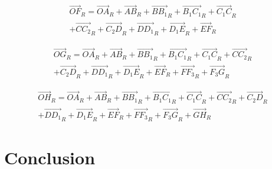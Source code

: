 \documentclass[12pt,a4paper]{article}
\begin{document}
\begin{equation}
    \begin{split}
        \vec{OF}_R=\vec{OA}_R+\vec{AB}_R+\vec{B B_1}_R+\vec{B_1 C_1}_R+\vec{C_1 C}_R\\+\vec{C C_2}_R+\vec{C_2 D}_R+\vec{D D_1}_R+\vec{D_1 E}_R+\vec{E F}_R
    \end{split}
\end{equation}

\begin{equation}
    \begin{split}
        \vec{OG}_R=\vec{OA}_R+\vec{AB}_R+\vec{B B_1}_R+\vec{B_1 C_1}_R+\vec{C_1 C}_R+\vec{C C_2}_R\\+\vec{C_2 D}_R+\vec{D D_1}_R+\vec{D_1 E}_R+\vec{E F}_R+\vec{F F_3}_R+\vec{F_3 G}_R
    \end{split}
\end{equation}

\begin{equation}
    \begin{split}
        \vec{OH}_R=\vec{OA}_R+\vec{AB}_R+\vec{B B_1}_R+\vec{B_1 C_1}_R+\vec{C_1 C}_R+\vec{C C_2}_R+\vec{C_2 D}_R\\+\vec{D D_1}_R+\vec{D_1 E}_R+\vec{E F}_R+\vec{F F_3}_R+\vec{F_3 G}_R+\vec{G H}_R
    \end{split}
\end{equation}


\section{Conclusion}
\end{document}
